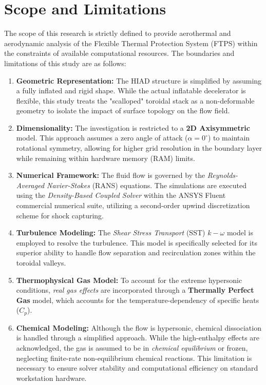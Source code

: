 \section{Scope and Limitations}

The scope of this research is strictly defined to provide aerothermal and aerodynamic analysis of the Flexible Thermal Protection System (FTPS) within the constraints of available computational resources. The boundaries and limitations of this study are as follows:

\begin{enumerate}
    \item \textbf{Geometric Representation:} The HIAD structure is simplified by assuming a fully inflated and rigid shape. While the actual inflatable decelerator is flexible, this study treats the "scalloped" toroidal stack as a non-deformable geometry to isolate the impact of surface topology on the flow field.
    
    \item \textbf{Dimensionality:} The investigation is restricted to a \textbf{2D Axisymmetric} model. This approach assumes a zero angle of attack ($\alpha = 0^\circ$) to maintain rotational symmetry, allowing for higher grid resolution in the boundary layer while remaining within hardware memory (RAM) limits.
    
    \item \textbf{Numerical Framework:} The fluid flow is governed by the \textit{Reynolds-Averaged Navier-Stokes} (RANS) equations. The simulations are executed using the \textit{Density-Based Coupled Solver} within the ANSYS Fluent commercial numerical suite, utilizing a second-order upwind discretization scheme for shock capturing.
    
    \item \textbf{Turbulence Modeling:} The \textit{Shear Stress Transport} (SST) $k-\omega$ model is employed to resolve the turbulence. This model is specifically selected for its superior ability to handle flow separation and recirculation zones within the toroidal valleys.
    
    \item \textbf{Thermophysical Gas Model:} To account for the extreme hypersonic conditions, \textit{real gas effects} are incorporated through a \textbf{Thermally Perfect Gas} model, which accounts for the temperature-dependency of specific heats ($C_p$). 
    
    \item \textbf{Chemical Modeling:} Although the flow is hypersonic, chemical dissociation is handled through a simplified approach. While the high-enthalpy effects are acknowledged, the gas is assumed to be in \textit{chemical equilibrium} or frozen, neglecting finite-rate non-equilibrium chemical reactions. This limitation is necessary to ensure solver stability and computational efficiency on standard workstation hardware.
\end{enumerate}

